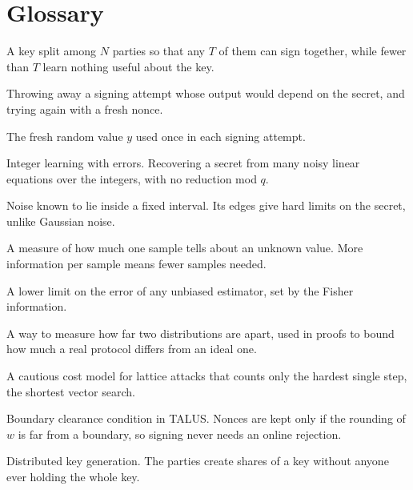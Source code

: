 \documentclass[10pt,conference,a4paper]{IEEEtran}
\begin{document}
\section{Glossary}\label{app:glossary}
\newcommand{\glossterm}[1]{\textbf{#1}}
\begin{list}{}{\setlength{\leftmargin}{1em}\setlength{\itemindent}{-1em}\setlength{\labelwidth}{0pt}%
  \setlength{\labelsep}{0.4em}\setlength{\itemsep}{1pt}\setlength{\parsep}{0pt}\let\makelabel\glossterm}
\item[Threshold signature.] A key split among $N$ parties so that any $T$ of them can sign together, while fewer than $T$
learn nothing useful about the key.
\item[Rejection sampling.] Throwing away a signing attempt whose output would depend on the secret, and trying again with
a fresh nonce.
\item[Nonce.] The fresh random value $y$ used once in each signing attempt.
\item[ILWE.] Integer learning with errors. Recovering a secret from many noisy linear equations over the integers, with no
reduction mod $q$.
\item[Bounded noise.] Noise known to lie inside a fixed interval. Its edges give hard limits on the secret, unlike Gaussian
noise.
\item[Fisher information.] A measure of how much one sample tells about an unknown value. More information per sample means
fewer samples needed.
\item[Cram\'er--Rao bound.] A lower limit on the error of any unbiased estimator, set by the Fisher information.
\item[R\'enyi divergence.] A way to measure how far two distributions are apart, used in proofs to bound how much a real
protocol differs from an ideal one.
\item[Core-SVP.] A cautious cost model for lattice attacks that counts only the hardest single step, the shortest vector
search.
\item[BCC.] Boundary clearance condition in TALUS. Nonces are kept only if the rounding of $w$ is far from a boundary, so
signing never needs an online rejection.
\item[DKG.] Distributed key generation. The parties create shares of a key without anyone ever holding the whole key.

\end{list}
\end{document}
